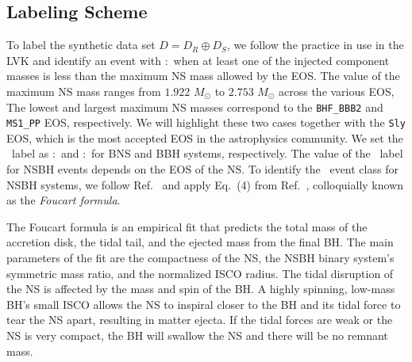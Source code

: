 \subsection{Labeling Scheme}


To label the synthetic data set $D=D_R\oplus D_S$, we follow the practice in use in the \ac{LVK} and identify an event with \hasns:\true\ when at least one of the injected component masses is less
than the maximum \ac{NS} mass allowed by the \ac{EOS}. The value of the maximum \ac{NS} mass ranges from $1.922$ $M_{\odot}$ to $2.753$ $M_{\odot}$ across the various \ac{EOS}, %
The lowest and largest maximum \ac{NS} masses correspond to the {\tt BHF\_BBB2} and {\tt MS1\_PP} \ac{EOS}, respectively. We will highlight these two cases together with the {\tt Sly} \ac{EOS}, which is the most accepted \ac{EOS} in the astrophysics community. We set the \hasrem\ label as \hasrem:\true\ and \hasrem:\false\ for
\ac{BNS} and \ac{BBH} systems, respectively. The value of the \hasrem\ label for \ac{NSBH} events depends on the \ac{EOS} of the \ac{NS}. To identify the \hasrem\ event class for \ac{NSBH} systems, 
we follow Ref.~\cite{Chatterjee:2019avs} and apply Eq.~(4) from Ref.~\cite{Foucart:2018rjc}, colloquially known as the \emph{Foucart formula}.

The Foucart formula is an empirical fit that predicts the total mass of the accretion disk, the tidal tail, and the ejected mass from the final \ac{BH}. The main parameters of the fit are
the compactness of the \ac{NS},  the \ac{NSBH} binary system's symmetric mass ratio, and the normalized \ac{ISCO} radius. The tidal disruption of the \ac{NS} is affected by the mass and spin of the \ac{BH}. A highly spinning, low-mass \ac{BH}'s small ISCO allows the \ac{NS} to inspiral closer to the \ac{BH} and its tidal force to tear the \ac{NS} apart, resulting in matter ejecta. If the tidal forces are weak or the \ac{NS} is very compact, the \ac{BH} will swallow the \ac{NS} and there will be no remnant mass.

